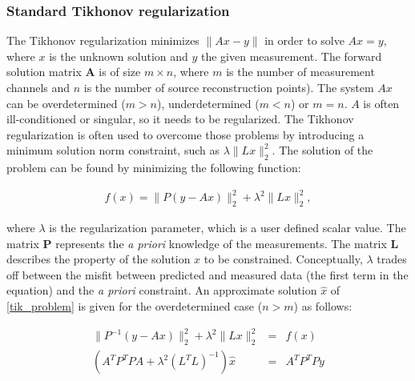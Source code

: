 \subsubsection{Standard Tikhonov regularization}

The Tikhonov regularization minimizes $ \| Ax - y \|$ in order to solve $Ax=y$, where $x$ is the unknown solution and $y$ the given measurement. The forward solution matrix $\mathbf{A}$ is of size $m\times n$, where $m$ is the number of measurement channels and $n$ is the number of source reconstruction points).
The system $Ax$ can be overdetermined ($m > n$), underdetermined ($m <n$) or $m=n$. $A$ is often ill-conditioned or singular, so it needs to be regularized. The Tikhonov regularization is often used to overcome those problems by introducing a minimum solution norm constraint, such as $\lambda \|Lx\|_2^2$. The solution of the problem can be found by minimizing the following function:
\begin{center}
\begin{eqnarray}
    f (x) = \| P (y - A x) \|^{2}_{2} + \lambda^{2} \| Lx \|^{2}_{2},
\label{tik_problem}
\end{eqnarray}
\end{center}

\noindent where $\lambda$ is the regularization parameter, which is a user defined scalar value. The matrix $\mathbf{P}$ represents the \textit{a priori} knowledge of the measurements. The matrix $\mathbf{L}$ describes the property of the solution $x$ to be constrained.
Conceptually, $\lambda$ trades off between the misfit between predicted and measured data (the first term in the equation) and the \textit{a priori} constraint.
An approximate solution $\hat{x}$ of \ref{tik_problem} is given for the
overdetermined case ($n > m$) as follows:
\begin{center}
\begin{eqnarray}
    \| P^{-1} (y - A x) \|^{2}_{2} + \lambda^{2} \| L x \|^{2}_{2} &=& f(x)
\nonumber \\
    (A^{T} P^{T} P A + \lambda^{2} (L^{T} L)^{-1}) \hat{x} &=& A^{T} P^{T} P
y \\
\label{tik_problem_overdet}
\end{eqnarray}
\end{center}

